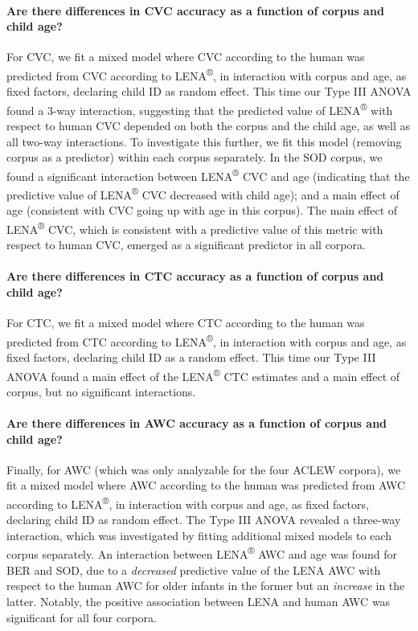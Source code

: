 \documentclass[english,table,man,floatsintext]{apa6}
\let\oldparagraph\paragraph
\renewcommand{\paragraph}[1]{\oldparagraph{#1}\mbox{}}
\begin{document}
\paragraph{Are there differences in CVC accuracy as a function of corpus
and child
age?}\label{are-there-differences-in-cvc-accuracy-as-a-function-of-corpus-and-child-age}

For CVC, we fit a mixed model where CVC according to the human was
predicted from CVC according to LENA\textsuperscript{®}, in interaction
with corpus and age, as fixed factors, declaring child ID as random
effect. This time our Type III ANOVA found a 3-way interaction,
suggesting that the predicted value of LENA\textsuperscript{®} with
respect to human CVC depended on both the corpus and the child age, as
well as all two-way interactions. To investigate this further, we fit
this model (removing corpus as a predictor) within each corpus
separately. In the SOD corpus, we found a significant interaction
between LENA\textsuperscript{®} CVC and age (indicating that the
predictive value of LENA\textsuperscript{®} CVC decreased with child
age); and a main effect of age (consistent with CVC going up with age in
this corpus). The main effect of LENA\textsuperscript{®} CVC, which is
consistent with a predictive value of this metric with respect to human
CVC, emerged as a significant predictor in all corpora.

\paragraph{Are there differences in CTC accuracy as a function of corpus
and child
age?}\label{are-there-differences-in-ctc-accuracy-as-a-function-of-corpus-and-child-age}

For CTC, we fit a mixed model where CTC according to the human was
predicted from CTC according to LENA\textsuperscript{®}, in interaction
with corpus and age, as fixed factors, declaring child ID as a random
effect. This time our Type III ANOVA found a main effect of the
LENA\textsuperscript{®} CTC estimates and a main effect of corpus, but
no significant interactions.

\paragraph{Are there differences in AWC accuracy as a function of corpus
and child
age?}\label{are-there-differences-in-awc-accuracy-as-a-function-of-corpus-and-child-age}

Finally, for AWC (which was only analyzable for the four ACLEW corpora),
we fit a mixed model where AWC according to the human was predicted from
AWC according to LENA\textsuperscript{®}, in interaction with corpus and
age, as fixed factors, declaring child ID as random effect. The Type III
ANOVA revealed a three-way interaction, which was investigated by
fitting additional mixed models to each corpus separately. An
interaction between LENA\textsuperscript{®} AWC and age was found for
BER and SOD, due to a \emph{decreased} predictive value of the LENA AWC
with respect to the human AWC for older infants in the former but an
\emph{increase} in the latter. Notably, the positive association between
LENA and human AWC was significant for all four corpora.
\end{document}
